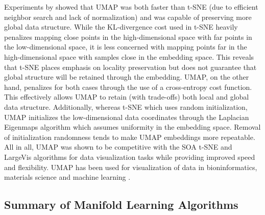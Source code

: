 Experiments by \cite{McInnes2018UMAP} showed that UMAP was both faster than t-SNE (due to efficient neighbor search and lack of normalization) and was capable of preserving more global data structure.  While the KL-divergence cost used in t-SNE heavily penalizes mapping close points in the high-dimensional space with far points in the low-dimensional space, it is less concerned with mapping points far in the high-dimensional space with samples close in the embedding space.  This reveals that t-SNE places emphasis on locality preservation but does not guarantee that global structure will be retained through the embedding.  UMAP, on the other hand, penalizes for both cases through the use of a cross-entropy cost function.  This effectively allows UMAP to retain (with trade-offs) both local and global data structure. Additionally, whereas t-SNE which uses random initialization, UMAP initializes the low-dimensional data coordinates through the Laplacian Eigenmaps algorithm which assumes uniformity in the embedding space.  Removal of initialization randomness tends to make UMAP embeddings more repeatable.  All in all, UMAP was shown to be competitive with the SOA t-SNE and LargeVis algorithms for data visualization tasks while providing improved speed and flexibility.  UMAP has been used for visualization of data in bioninformatics, materials science and machine learning \citep{McInnes2018UMAP}. 


\subsection{Summary of Manifold Learning Algorithms} \label{sec:Manifold_Learning_Discussion}

